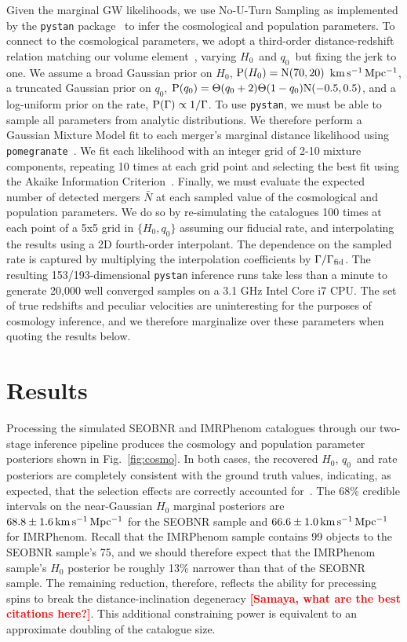 \documentclass[%
 reprint,
 superscriptaddress,
 nofootinbib,
 amsmath,amssymb,
 aps,
]{revtex4-2}
\newcommand{\hubble}{\ensuremath{H_0}}
\newcommand{\decel}{\ensuremath{q_0}}
\newcommand{\prob}{\ensuremath{{\rm P}}}
\newcommand{\normal}{{\rm{N}}}
\newcommand{\nexp}{\bar{N}}
\newcommand{\rate}{\Gamma}
\newcommand{\step}{\Theta}
\newcommand{\kmsmpc}{\ensuremath{{\rm km\,s^{-1}\,Mpc^{-1}}}}
\newcommand{\smf}[1]{\textcolor{red}{\bf [#1]}}
\begin{document}
Given the marginal GW likelihoods, we use No-U-Turn Sampling as implemented by the \texttt{pystan} package~\cite{pystan} to infer the cosmological and population parameters. To connect to the cosmological parameters, we adopt a third-order distance-redshift relation matching our volume element~\cite{Visser:2004}, varying \hubble\ and \decel\ but fixing the jerk to one. We assume a broad Gaussian prior on \hubble, $\prob(\hubble)=\normal(70,20)$ \kmsmpc, a truncated Gaussian prior on \decel, $\prob(\decel)=\step(\decel+2)\step(1-\decel)\normal(-0.5,0.5)$, and a log-uniform prior on the rate, $\prob(\rate) \propto 1/\rate$. To use \texttt{pystan}, we must be able to sample all parameters from analytic distributions. We therefore perform a Gaussian Mixture Model fit to each merger's marginal distance likelihood using \texttt{pomegranate}~\cite{Schreiber:2017}. We fit each likelihood with an integer grid of 2-10 mixture components, repeating 10 times at each grid point and selecting the best fit using the Akaike Information Criterion~\cite{Akaike:1974}. Finally, we must evaluate the expected number of detected mergers $\nexp$ at each sampled value of the cosmological and population parameters. We do so by re-simulating the catalogues 100 times at each point of a 5x5 grid in $\{H_0,q_0\}$ assuming our fiducial rate, and interpolating the results using a 2D fourth-order interpolant. The dependence on the sampled rate is captured by multiplying the interpolation coefficients by $\Gamma/\Gamma_{\rm fid}$. The resulting 153/193-dimensional \texttt{pystan} inference runs take less than a minute to generate 20,000 well converged samples on a 3.1 GHz Intel Core i7 CPU. The set of true redshifts and peculiar velocities are uninteresting for the purposes of cosmology inference, and we therefore marginalize over these parameters when quoting the results below.


\section{Results} \label{sec:results}

Processing the simulated SEOBNR and IMRPhenom catalogues through our two-stage inference pipeline produces the cosmology and population parameter posteriors shown in Fig.~\ref{fig:cosmo}. In both cases, the recovered \hubble, \decel\ and rate posteriors are completely consistent with the ground truth values, indicating, as expected, that the selection effects are correctly accounted for~\cite{Mortlock_etal:2019}. The 68\% credible intervals on the near-Gaussian $\hubble$ marginal posteriors are $68.8 \pm 1.6\,\kmsmpc$ for the SEOBNR sample and $66.6 \pm 1.0\,\kmsmpc$ for IMRPhenom. Recall that the IMRPhenom sample contains 99 objects to the SEOBNR sample's 75, and we should therefore expect that the IMRPhenom sample's $\hubble$ posterior be roughly 13\% narrower than that of the SEOBNR sample. The remaining reduction, therefore, reflects the ability for precessing spins to break the distance-inclination degeneracy \smf{Samaya, what are the best citations here?}. This additional constraining power is equivalent to an approximate doubling of the catalogue size.
\end{document}

